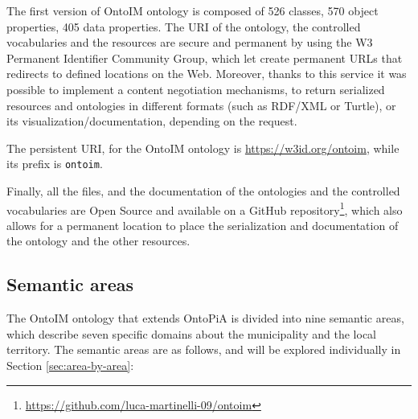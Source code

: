 The first version of \ac{OntoIM} ontology is composed of 526 classes, 570 object properties, 405 data properties. The \ac{URI} of the ontology, the controlled vocabularies and the resources are secure and permanent by using the  W3 Permanent Identifier Community Group, which let create permanent \acp{URL} that redirects to defined locations on the Web. Moreover, thanks to this service it was possible to implement a content negotiation mechanisms, to return serialized resources and ontologies in different formats (such as \ac{RDF}/\ac{XML} or Turtle), or its visualization/documentation, depending on the request.

The persistent \ac{URI}, for the \ac{OntoIM} ontology is \url{https://w3id.org/ontoim}, while its prefix is \verb#ontoim#.

Finally, all the files, and the documentation of the ontologies and the controlled vocabularies are Open Source and available on a GitHub repository\footnote{\url{https://github.com/luca-martinelli-09/ontoim}}, which also allows for a permanent location to place the serialization and documentation of the ontology and the other resources.

\subsection{Semantic areas}
\label{subsec:semantic-areas}

The \ac{OntoIM} ontology that extends OntoPiA is divided into nine semantic areas, which describe seven specific domains about the municipality and the local territory. The semantic areas are as follows, and will be explored individually in Section \ref{sec:area-by-area}:

